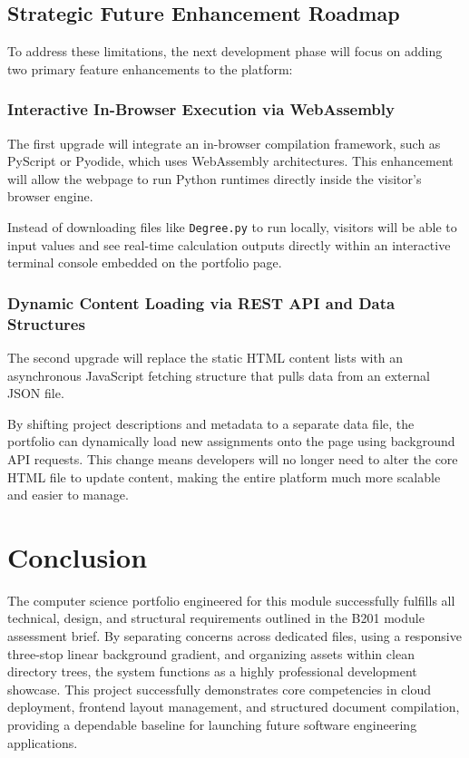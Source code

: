\documentclass[12pt,a4paper]{article}
\begin{document}
\subsection{Strategic Future Enhancement Roadmap}
To address these limitations, the next development phase will focus on adding two primary feature enhancements to the platform:

\subsubsection{Interactive In-Browser Execution via WebAssembly}
The first upgrade will integrate an in-browser compilation framework, such as PyScript or Pyodide, which uses WebAssembly architectures. This enhancement will allow the webpage to run Python runtimes directly inside the visitor's browser engine. 

Instead of downloading files like \texttt{Degree.py} to run locally, visitors will be able to input values and see real-time calculation outputs directly within an interactive terminal console embedded on the portfolio page.

\subsubsection{Dynamic Content Loading via REST API and Data Structures}
The second upgrade will replace the static HTML content lists with an asynchronous JavaScript fetching structure that pulls data from an external JSON file. 

By shifting project descriptions and metadata to a separate data file, the portfolio can dynamically load new assignments onto the page using background API requests. This change means developers will no longer need to alter the core HTML file to update content, making the entire platform much more scalable and easier to manage.

\section{Conclusion}
The computer science portfolio engineered for this module successfully fulfills all technical, design, and structural requirements outlined in the B201 module assessment brief. By separating concerns across dedicated files, using a responsive three-stop linear background gradient, and organizing assets within clean directory trees, the system functions as a highly professional development showcase. This project successfully demonstrates core competencies in cloud deployment, frontend layout management, and structured document compilation, providing a dependable baseline for launching future software engineering applications.
\end{document}
